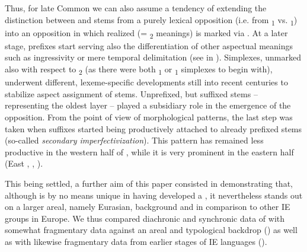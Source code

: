 \documentclass[output=paper]{langsci/langscibook}
\begin{document}
Thus, for late Common  we can also assume a tendency of extending the distinction between  and  stems from a purely lexical opposition (i.e. from \textsubscript{1} vs. \textsubscript{1}) into an opposition in which realized  (= \textsubscript{2} meanings) is marked via . At a later stage, prefixes start serving also the differentiation of other aspectual meanings such as ingressivity or mere temporal delimitation (see  in ). Simplexes, unmarked also with respect to \textsubscript{2} (as there were both \textsubscript{1} or \textsubscript{1} simplexes to begin with), underwent different, lexeme-specific developments still into recent centuries to stabilize aspect assignment of stems. Unprefixed, but suffixed stems – representing the oldest layer – played a subsidiary role in the emergence of the opposition. From the point of view of morphological patterns, the last step was taken when suffixes started being productively attached to already prefixed stems (so-called \textit{secondary imperfectivization}). This pattern has remained less productive in the western half of , while it is very prominent in the eastern half (East , , ).

This being settled, a further aim of this paper consisted in demonstrating that, although  is by no means unique in having developed a , it nevertheless stands out on a larger areal, namely Eurasian, background and in comparison to other IE groups in Europe. We thus compared diachronic and synchronic data of  with somewhat fragmentary data against an areal and typological backdrop () as well as with likewise fragmentary data from earlier stages of IE languages ().
\end{document}
